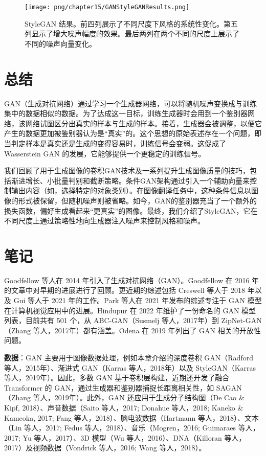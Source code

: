 \begin{figure}[ht!]
\centering
\texttt{[image: png/chapter15/GANStyleGANResults.png]}
\caption{StyleGAN 结果。前四列展示了不同尺度下风格的系统性变化。第五列显示了增大噪声幅度的效果。最后两列在两个不同的尺度上展示了不同的噪声向量变化。}
\end{figure}


\section{总结}
GAN（生成对抗网络）通过学习一个生成器网络，可以将随机噪声变换成与训练集中的数据相似的数据。为了达成这一目标，训练生成器时会用到一个鉴别器网络，该网络试图区分出真实的样本与生成的样本。接着，生成器会被调整，以便它产生的数据更加被鉴别器认为是“真实”的。这个思想的原始表述存在一个问题，即当判定样本是真实还是生成的变得容易时，训练信号会变弱。这促成了 Wasserstein GAN 的发展，它能够提供一个更稳定的训练信号。

我们回顾了用于生成图像的卷积GAN技术及一系列提升生成图像质量的技巧，包括渐进增长、小批量判别和截断策略。条件GAN架构通过引入一个辅助向量来控制输出内容（如，选择特定的对象类别）。在图像翻译任务中，这种条件信息以图像的形式被保留，但随机噪声则被省略。如今，GAN的鉴别器充当了一个额外的损失函数，偏好生成看起来“更真实”的图像。最终，我们介绍了StyleGAN，它在不同尺度上通过策略性地向生成器注入噪声来控制风格和噪声。

\section{笔记}
Goodfellow 等人在 2014 年引入了生成对抗网络（GAN）。Goodfellow 在 2016 年的文章中对早期的进展进行了回顾。更近期的综述包括 Creswell 等人于 2018 年以及 Gui 等人于 2021 年的工作。Park 等人在 2021 年发布的综述专注于 GAN 模型在计算机视觉应用中的进展。Hindupur 在 2022 年维护了一份命名的 GAN 模型列表，目前共有 501 个，从 ABC-GAN（Susmelj 等人，2017年）到 ZipNet-GAN（Zhang 等人，2017年）都有涵盖。Odena 在 2019 年列出了 GAN 相关的开放性问题。

\textbf{数据}：GAN 主要用于图像数据处理，例如本章介绍的深度卷积 GAN（Radford 等人，2015年）、渐进式 GAN（Karras 等人，2018年）以及 StyleGAN（Karras 等人，2019年）。因此，多数 GAN 基于卷积层构建，近期还开发了融合 Transformer 的 GAN，通过生成器和鉴别器捕捉长距离相关性，如 SAGAN（Zhang 等人，2019年）。此外，GAN 还应用于生成分子结构图（De Cao \& Kipf, 2018）、声音数据（Saito 等人，2017; Donahue 等人，2018; Kaneko \& Kameoka, 2017; Fang 等人，2018）、脑电波数据（Hartmann 等人，2018）、文本（Lin 等人，2017; Fedus 等人，2018）、音乐（Mogren，2016; Guimaraes 等人，2017; Yu 等人，2017）、3D 模型（Wu 等人，2016）、DNA（Killoran 等人，2017）及视频数据（Vondrick 等人，2016; Wang 等人，2018）。

